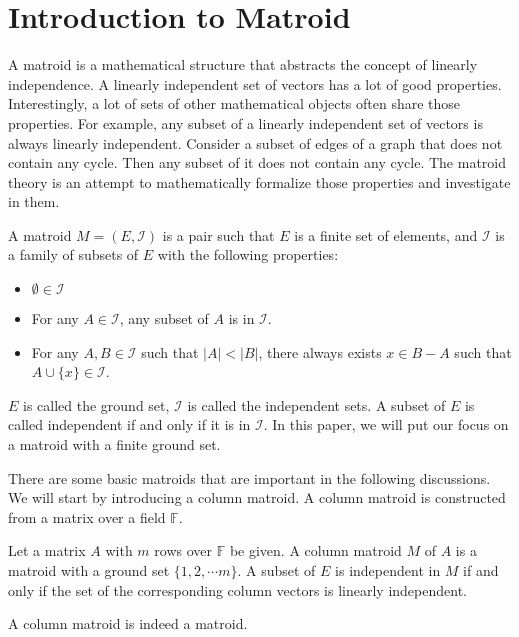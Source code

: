 \section{Introduction to Matroid}

A matroid is a mathematical structure that abstracts the concept of linearly independence.
A linearly independent set of vectors has a lot of good properties.
Interestingly, a lot of sets of other mathematical objects often share those properties.
For example, any subset of a linearly independent set of vectors is always linearly independent.
Consider a subset of edges of a graph that does not contain any cycle.
Then any subset of it does not contain any cycle.
The matroid theory is an attempt to mathematically formalize those properties and investigate in them.

\begin{defn}
A matroid $M = (E, \mathcal{I})$ is a pair such that $E$ is a finite set of elements, and $\mathcal{I}$ is a family of subsets of $E$ with the following properties:
\begin{itemize}
\item $\emptyset \in \mathcal{I}$
\item For any $A\in \mathcal{I}$, any subset of $A$ is in $\mathcal{I}$.
\item For any $A, B \in \mathcal{I}$ such that $\lvert A \rvert < \lvert B \rvert$, there always exists $x \in B - A$ such that $A \cup \{ x \} \in \mathcal{I}$.
\end{itemize}
\end{defn}
$E$ is called the ground set, $\mathcal{I}$ is called the independent sets. A subset of $E$ is called independent if and only if it is in $\mathcal{I}$.
In this paper, we will put our focus on a matroid with a finite ground set. 


There are some basic matroids that are important in the following discussions.
We will start by introducing a column matroid. 
A column matroid is constructed from a matrix over a field $\mathbb{F}$.

\begin{defn}
Let a matrix $A$ with $m$ rows over $\mathbb{F}$ be given.
A column matroid $M$ of $A$ is a matroid with a ground set $\{ 1, 2, \cdots m \}$.
A subset of $E$ is independent in $M$ if and only if the set of the corresponding column vectors is linearly independent.
\end{defn}

\begin{thm}
A column matroid is indeed a matroid.
\end{thm}

